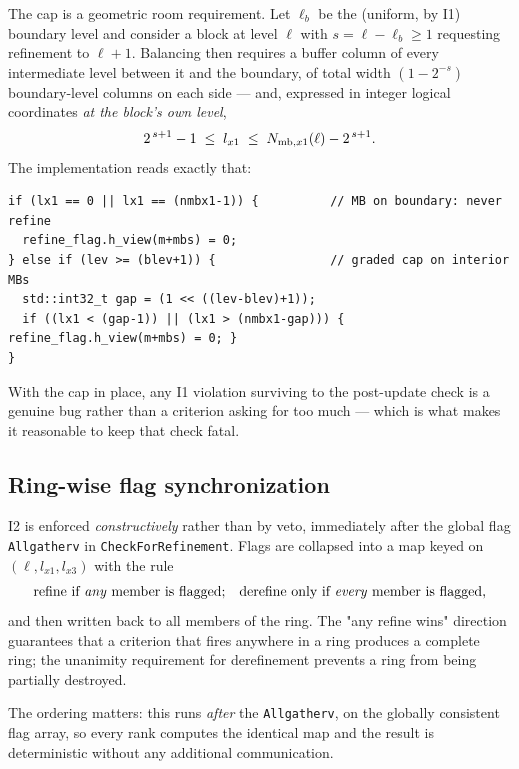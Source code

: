 \documentclass[11pt]{article}
\newcommand{\code}[1]{\texttt{#1}}
\newcommand{\fn}[1]{\texttt{\small #1}}
\begin{document}
The cap is a geometric room requirement. Let $\ell_b$ be the (uniform, by I1) boundary
level and consider a block at level $\ell$ with $s = \ell - \ell_b \ge 1$ requesting
refinement to $\ell+1$. Balancing then requires a buffer column of every intermediate
level between it and the boundary, of total width
$\left(1 - 2^{-s}\right)$ boundary-level columns on each side --- and, expressed in
integer logical coordinates \emph{at the block's own level},
\begin{equation}
  2^{\,s+1} - 1 \;\le\; l_{x1} \;\le\; N_{{\rm mb},x1}(\ell) - 2^{\,s+1}.
  \label{eq:cap}
\end{equation}
The implementation reads exactly that:

\begin{lstlisting}
if (lx1 == 0 || lx1 == (nmbx1-1)) {          // MB on boundary: never refine
  refine_flag.h_view(m+mbs) = 0;
} else if (lev >= (blev+1)) {                // graded cap on interior MBs
  std::int32_t gap = (1 << ((lev-blev)+1));
  if ((lx1 < (gap-1)) || (lx1 > (nmbx1-gap))) { refine_flag.h_view(m+mbs) = 0; }
}
\end{lstlisting}

With the cap in place, any I1 violation surviving to the post-update check is a
genuine bug rather than a criterion asking for too much --- which is what makes it
reasonable to keep that check fatal.

\subsection{Ring-wise flag synchronization}
\label{sec:ringsync}

I2 is enforced \emph{constructively} rather than by veto, immediately after the global
flag \code{Allgatherv} in \fn{CheckForRefinement}. Flags are collapsed into a map keyed
on $(\ell, l_{x1}, l_{x3})$ with the rule
\begin{equation}
  \text{refine if \emph{any} member is flagged;\quad derefine only if \emph{every}
  member is flagged,}
\end{equation}
and then written back to all members of the ring. The "any refine wins" direction
guarantees that a criterion that fires anywhere in a ring produces a complete ring; the
unanimity requirement for derefinement prevents a ring from being partially destroyed.

The ordering matters: this runs \emph{after} the \code{Allgatherv}, on the globally
consistent flag array, so every rank computes the identical map and the result is
deterministic without any additional communication.
\end{document}
